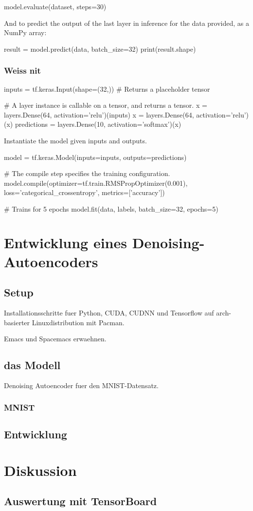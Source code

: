model.evaluate(dataset, steps=30)


And to predict the output of the last layer in inference for the data provided, as a NumPy array:

result = model.predict(data, batch_size=32)
print(result.shape)

\subsection{Weiss nit}
inputs = tf.keras.Input(shape=(32,))  # Returns a placeholder tensor

# A layer instance is callable on a tensor, and returns a tensor.
x = layers.Dense(64, activation='relu')(inputs)
x = layers.Dense(64, activation='relu')(x)
predictions = layers.Dense(10, activation='softmax')(x)

Instantiate the model given inputs and outputs.

model = tf.keras.Model(inputs=inputs, outputs=predictions)

# The compile step specifies the training configuration.
model.compile(optimizer=tf.train.RMSPropOptimizer(0.001),
loss='categorical_crossentropy',
metrics=['accuracy'])

# Trains for 5 epochs
model.fit(data, labels, batch_size=32, epochs=5)



\chapter{Entwicklung eines Denoising-Autoencoders}

\section{Setup}
Installationsschritte fuer Python, CUDA, CUDNN und Tensorflow auf arch-basierter Linuxdistribution mit Pacman.

Emacs und Spacemacs erwaehnen.

\section{das Modell}
Denoising Autoencoder fuer den MNIST-Datensatz.

\subsection{MNIST}

\section{Entwicklung}




\chapter{Diskussion}
\section{Auswertung mit TensorBoard}


